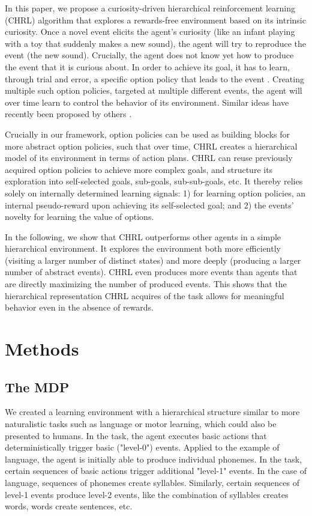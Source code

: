 \documentclass{article}
\begin{document}
In this paper, we propose a curiosity-driven hierarchical reinforcement learning (CHRL) algorithm that explores a rewards-free environment based on its intrinsic curiosity. Once a novel event elicits the agent's curiosity (like an infant playing with a toy that suddenly makes a new sound), the agent will try to reproduce the event (the new sound). Crucially, the agent does not know yet how to produce the event that it is curious about. In order to achieve its goal, it has to learn, through trial and error, a specific option policy that leads to the event \cite{sutton_between_1999}. Creating multiple such option policies, targeted at multiple different events, the agent will over time learn to control the behavior of its environment. Similar ideas have recently been proposed by others \cite{machado_learning_2016, chentanez_intrinsically_2005, pathak_curiosity-driven_2017, kulkarni_hierarchical_2016}.

Crucially in our framework, option policies can be used as building blocks for more abstract option policies, such that over time, CHRL creates a hierarchical model of its environment in terms of action plans. CHRL can reuse previously acquired option policies to achieve more complex goals, and structure its exploration into self-selected goals, sub-goals, sub-sub-goals, etc. It thereby relies solely on internally determined learning signals: 1) for learning option policies, an internal pseudo-reward upon achieving its self-selected goal; and 2) the events' novelty for learning the value of options.

In the following, we show that CHRL outperforms other agents in a simple hierarchical environment. It explores the environment both more efficiently (visiting a larger number of distinct states) and more deeply (producing a larger number of abstract events). CHRL even produces more events than agents that are directly maximizing the number of produced events. This shows that the hierarchical representation CHRL acquires of the task allows for meaningful behavior even in the absence of rewards. 

\section{Methods}

\subsection{The MDP}

We created a learning environment with a hierarchical structure similar to more naturalistic tasks such as language or motor learning, which could also be presented to humans.
In the task, the agent executes basic actions that deterministically trigger basic ("level-0") events. Applied to the example of language, the agent is initially able to produce individual phonemes. In the task, certain sequences of basic actions trigger additional "level-1" events. In the case of language, sequences of phonemes create syllables. Similarly, certain sequences of level-1 events produce level-2 events, like the combination of syllables creates words, words create sentences, etc.
\end{document}
